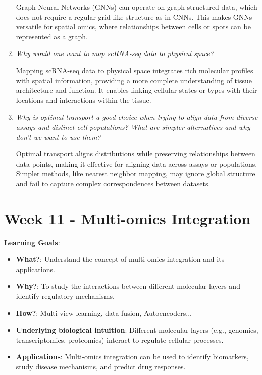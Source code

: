\documentclass[a4paper]{article}
\begin{document}
\begin{enumerate}
    Graph Neural Networks (GNNs) can operate on graph-structured data, which does not require a regular grid-like structure as in CNNs.  
    This makes GNNs versatile for spatial omics, where relationships between cells or spots can be represented as a graph.  

    \item \textit{Why would one want to map scRNA-seq data to physical space?}  
    
    Mapping scRNA-seq data to physical space integrates rich molecular profiles with spatial information, providing a more complete understanding of tissue architecture and function.  
    It enables linking cellular states or types with their locations and interactions within the tissue.  

    \item \textit{Why is optimal transport a good choice when trying to align data from diverse assays and distinct cell populations? What are simpler alternatives and why don’t we want to use them?}  
    
    Optimal transport aligns distributions while preserving relationships between data points, making it effective for aligning data across assays or populations.  
    Simpler methods, like nearest neighbor mapping, may ignore global structure and fail to capture complex correspondences between datasets.  

\end{enumerate}

\newpage

\section*{Week 11 - Multi-omics Integration}

\textbf{Learning Goals}:

\begin{itemize}
  \item \textbf{What?}: Understand the concept of multi-omics integration and its applications.
  \item \textbf{Why?}: To study the interactions between different molecular layers and identify regulatory mechanisms.
  \item \textbf{How?}: Multi-view learning, data fusion, Autoencoders...
  \item \textbf{Underlying biological intuition}: Different molecular layers (e.g., genomics, transcriptomics, proteomics) interact to regulate cellular processes.
  \item \textbf{Applications}: Multi-omics integration can be used to identify biomarkers, study disease mechanisms, and predict drug responses.
\end{itemize}
\end{document}
